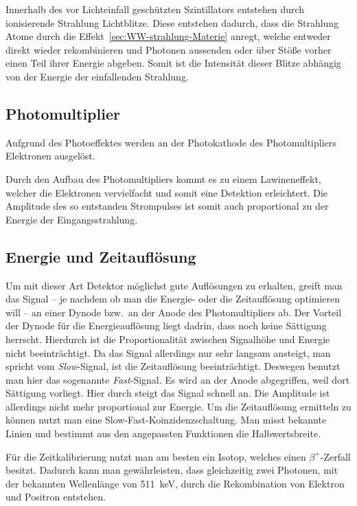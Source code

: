 \documentclass[11pt, ngerman, fleqn, DIV=15, headinclude, BCOR=2cm]{scrreprt}
\begin{document}
Innerhalb des vor Lichteinfall geschützten Szintillators entstehen durch
ionisierende Strahlung Lichtblitze. 
Diese entstehen dadurch, dass die Strahlung Atome durch die
Effekt~\ref{sec:WW-strahlung-Materie} anregt, welche entweder direkt
wieder rekombinieren und Photonen aussenden oder über Stöße vorher einen Teil
ihrer Energie abgeben.
Somit ist die Intensität dieser Blitze abhängig von der Energie der einfallenden Strahlung.

\subsection{Photomultiplier}

Aufgrund des Photoeffektes werden an der Photokathode des Photomultipliers
Elektronen ausgelöst.

Durch den Aufbau des Photomultipliers kommt es zu einem Lawineneffekt,
welcher die Elektronen vervielfacht und somit eine Detektion erleichtert.
Die Amplitude des so entstanden Strompulses ist somit auch proportional zu der
Energie der Eingangsstrahlung.

\subsection{Energie und Zeitauflösung}

Um mit dieser Art Detektor möglichst gute Auflösungen zu erhalten, greift man
das Signal -- je nachdem ob man die Energie- oder die Zeitauflösung optimieren
will --
an einer Dynode bzw.\ an der Anode des Photomultipliers ab.
Der Vorteil der Dynode für die Energieauflösung liegt dadrin, dass noch keine
Sättigung herrscht. Hierdurch ist die Proportionalität zwischen Signalhöhe und
Energie nicht beeinträchtigt. Da das Signal allerdings nur sehr langsam
ansteigt, man spricht vom \emph{Slow}-Signal, ist die Zeitauflösung beeinträchtigt.
Deswegen benutzt man hier das sogenannte \emph{Fast}-Signal. Es wird an der Anode
abgegriffen, weil dort Sättigung vorliegt. Hier durch steigt das Signal schnell an.
Die Amplitude ist allerdings nicht mehr proportional zur Energie.
Um die Zeitauflösung ermitteln zu können nutzt man eine
Slow-Fast-Koinzidenzschaltung. Man misst bekannte Linien und bestimmt aus den
angepassten Funktionen die Halbwertsbreite.

Für die Zeitkalibrierung nutzt man
am besten ein Isotop, welches einen $\beta^+$-Zerfall besitzt. Dadurch kann
man gewährleisten, dass gleichzeitig zwei Photonen, mit der bekannten Wellenlänge
von \SI{511}{\kilo\electronvolt}, durch die Rekombination von Elektron und
Positron entstehen.
\end{document}
